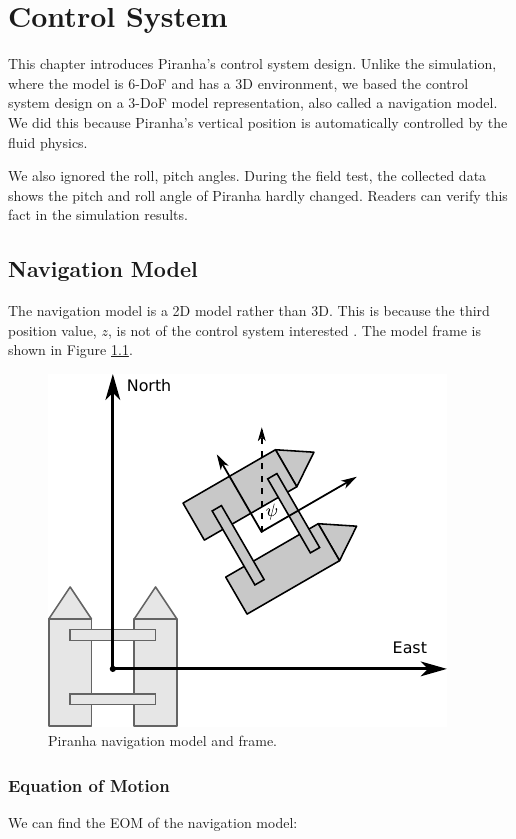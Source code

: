 \chapter{Control System}

This chapter introduces Piranha's control system design. Unlike the simulation, where the model is 6-DoF and has a 3D environment, we based the control system design on a 3-DoF model representation, also called a navigation model. We did this because Piranha's vertical position is automatically controlled by the fluid physics. 

We also ignored the roll, pitch angles. During the field test, the collected data shows the pitch and roll angle of Piranha hardly changed. Readers can verify this fact in the simulation results.

\section{Navigation Model}

The navigation model is a 2D model rather than 3D. This is because the third position value, $z$, is not of the control system interested \cite{aastrom1976identification}. The model frame is shown in Figure \ref{fig:05nav-model}.

\begin{figure}[H]
    \centering
    \includegraphics[width=.6\textwidth]{images/05nav-model.pdf}
    \caption{Piranha navigation model and frame.}
    \label{fig:05nav-model}
\end{figure}

\subsection{Equation of Motion}

We can find the EOM of the navigation model:

